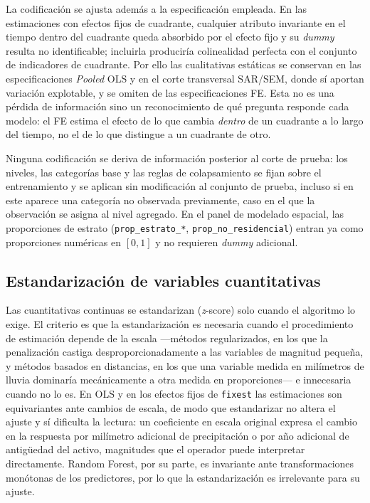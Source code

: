 La codificación se ajusta además a la especificación empleada. En las estimaciones con efectos fijos de cuadrante, cualquier atributo invariante en el tiempo dentro del cuadrante queda absorbido por el efecto fijo y su \emph{dummy} resulta no identificable; incluirla produciría colinealidad perfecta con el conjunto de indicadores de cuadrante. Por ello las cualitativas estáticas se conservan en las especificaciones \emph{Pooled} OLS y en el corte transversal SAR/SEM, donde sí aportan variación explotable, y se omiten de las especificaciones FE. Esta no es una pérdida de información sino un reconocimiento de qué pregunta responde cada modelo: el FE estima el efecto de lo que cambia \textit{dentro} de un cuadrante a lo largo del tiempo, no el de lo que distingue a un cuadrante de otro.

Ninguna codificación se deriva de información posterior al corte de prueba: los niveles, las categorías base y las reglas de colapsamiento se fijan sobre el entrenamiento y se aplican sin modificación al conjunto de prueba, incluso si en este aparece una categoría no observada previamente, caso en el que la observación se asigna al nivel agregado. En el panel de modelado espacial, las proporciones de estrato (\texttt{prop\_estrato\_*}, \texttt{prop\_no\_residencial}) entran ya como proporciones numéricas en $[0,1]$ y no requieren \emph{dummy} adicional.

\subsection{Estandarización de variables cuantitativas}
\label{sec:estandarizacion}
Las cuantitativas continuas se estandarizan (\emph{z}-score) solo cuando el algoritmo lo exige. El criterio es que la estandarización es necesaria cuando el procedimiento de estimación depende de la escala —métodos regularizados, en los que la penalización castiga desproporcionadamente a las variables de magnitud pequeña, y métodos basados en distancias, en los que una variable medida en milímetros de lluvia dominaría mecánicamente a otra medida en proporciones— e innecesaria cuando no lo es. En OLS y en los efectos fijos de \texttt{fixest} las estimaciones son equivariantes ante cambios de escala, de modo que estandarizar no altera el ajuste y sí dificulta la lectura: un coeficiente en escala original expresa el cambio en la respuesta por milímetro adicional de precipitación o por año adicional de antigüedad del activo, magnitudes que el operador puede interpretar directamente. Random Forest, por su parte, es invariante ante transformaciones monótonas de los predictores, por lo que la estandarización es irrelevante para su ajuste.

